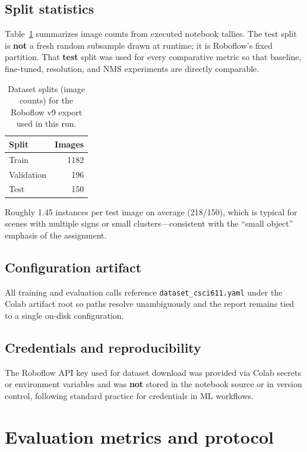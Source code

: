 \documentclass[11pt,a4paper]{article}
\begin{document}
\subsection{Split statistics}
Table~\ref{tab:splits} summarizes image counts from executed notebook tallies. The test split is \textbf{not} a fresh random subsample drawn at runtime; it is Roboflow's fixed partition. That \textbf{test} split was used for every comparative metric so that baseline, fine-tuned, resolution, and NMS experiments are directly comparable.

\begin{table}[htbp]
  \centering
  \caption{Dataset splits (image counts) for the Roboflow v9 export used in this run.}
  \label{tab:splits}
  \begin{tabular}{@{}lr@{}}
    \toprule
    Split & Images \\
    \midrule
    Train & 1182 \\
    Validation & 196 \\
    Test & 150 \\
    \bottomrule
  \end{tabular}
\end{table}

Roughly \num{1.45} instances per test image on average (\num{218}/\num{150}), which is typical for scenes with multiple signs or small clusters---consistent with the ``small object'' emphasis of the assignment.

\subsection{Configuration artifact}
All training and evaluation calls reference \texttt{dataset\_csci611.yaml} under the Colab artifact root so paths resolve unambiguously and the report remains tied to a single on-disk configuration.

\subsection{Credentials and reproducibility}
The Roboflow API key used for dataset download was provided via Colab secrets or environment variables and was \textbf{not} stored in the notebook source or in version control, following standard practice for credentials in ML workflows.

\section{Evaluation metrics and protocol}
\end{document}
